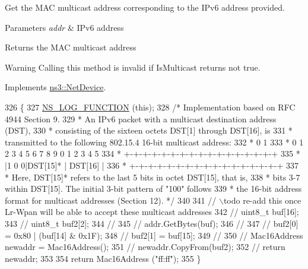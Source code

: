Get the M\+AC multicast address corresponding to the I\+Pv6 address provided. 


\begin{DoxyParams}{Parameters}
{\em addr} & I\+Pv6 address \\
\hline
\end{DoxyParams}
\begin{DoxyReturn}{Returns}
the M\+AC multicast address 
\end{DoxyReturn}
\begin{DoxyWarning}{Warning}
Calling this method is invalid if Is\+Multicast returns not true. 
\end{DoxyWarning}


Implements \hyperlink{classns3_1_1NetDevice_a46479a2c0101c6f9da9251ed4d7575bd}{ns3\+::\+Net\+Device}.


\begin{DoxyCode}
326 \{
327   \hyperlink{log-macros-disabled_8h_a90b90d5bad1f39cb1b64923ea94c0761}{NS\_LOG\_FUNCTION} (\textcolor{keyword}{this});
328   \textcolor{comment}{/* Implementation based on RFC 4944 Section 9.}
329 \textcolor{comment}{   * An IPv6 packet with a multicast destination address (DST),}
330 \textcolor{comment}{   * consisting of the sixteen octets DST[1] through DST[16], is}
331 \textcolor{comment}{   * transmitted to the following 802.15.4 16-bit multicast address:}
332 \textcolor{comment}{   *           0                   1}
333 \textcolor{comment}{   *           0 1 2 3 4 5 6 7 8 9 0 1 2 3 4 5}
334 \textcolor{comment}{   *          +-+-+-+-+-+-+-+-+-+-+-+-+-+-+-+-+}
335 \textcolor{comment}{   *          |1 0 0|DST[15]* |   DST[16]     |}
336 \textcolor{comment}{   *          +-+-+-+-+-+-+-+-+-+-+-+-+-+-+-+-+}
337 \textcolor{comment}{   * Here, DST[15]* refers to the last 5 bits in octet DST[15], that is,}
338 \textcolor{comment}{   * bits 3-7 within DST[15].  The initial 3-bit pattern of "100" follows}
339 \textcolor{comment}{   * the 16-bit address format for multicast addresses (Section 12). */}
340 
341   \textcolor{comment}{// \(\backslash\)todo re-add this once Lr-Wpan will be able to accept these multicast addresses}
342   \textcolor{comment}{//  uint8\_t buf[16];}
343   \textcolor{comment}{//  uint8\_t buf2[2];}
344   \textcolor{comment}{//}
345   \textcolor{comment}{//  addr.GetBytes(buf);}
346   \textcolor{comment}{//}
347   \textcolor{comment}{//  buf2[0] = 0x80 | (buf[14] & 0x1F);}
348   \textcolor{comment}{//  buf2[1] = buf[15];}
349   \textcolor{comment}{//}
350   \textcolor{comment}{//  Mac16Address newaddr = Mac16Address();}
351   \textcolor{comment}{//  newaddr.CopyFrom(buf2);}
352   \textcolor{comment}{//  return newaddr;}
353 
354   \textcolor{keywordflow}{return} Mac16Address (\textcolor{stringliteral}{"ff:ff"});
355 \}
\end{DoxyCode}
